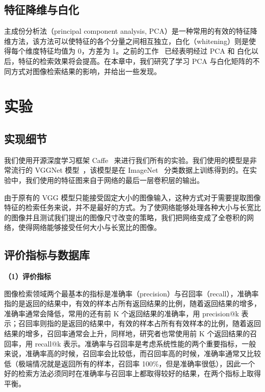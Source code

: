 \subsection{特征降维与白化}

主成份分析法（principal component analysis, PCA）是一种常用的有效的特征降维方法，该方法可以使特征的各个分量之间相互独立，白化（whitening）则是使得每个维度特征均值为 0，方差为 1。之前的工作~\cite{Babenko2014NeuralCF} 已经表明经过 PCA 和 白化以后，特征的检索效果将会提高。在本章中，我们研究了学习 PCA 与白化矩阵的不同方式对图像检索结果的影响，并给出一些发现。

\section{实验}\label{sec:mfc_experiment}
\subsection{实现细节}

我们使用开源深度学习框架 Caffe~\cite{Jia2014CaffeCA} 来进行我们所有的实验。我们使用的模型是非常流行的 VGGNet 模型~\cite{Simonyan2014VeryDC}，该模型是在 ImageNet~\cite{Russakovsky2015ImageNetLS} 分类数据上训练得到的。在实验中，我们使用的特征图来自于网络的最后一层卷积层的输出。

由于原有的 VGG 模型只能接受固定大小的图像输入，这种方式对于需要提取图像特征的检索任务来说，并不是最好的方式。为了使网络能够处理各种大小与长宽比的图像并且测试我们提出的图像尺寸改变的策略，我们把网络变成了全卷积的网络，使得网络能够接受任何大小与长宽比的图像。

\subsection{评价指标与数据库}

\noindent\textbf{（1）评价指标}

图像检索领域两个最基本的指标是准确率（precision）与召回率（recall），准确率指的是返回的结果中，有效的样本占所有返回结果的比例，随着返回结果的增多，准确率通常会降低，常用的还有前 K 个返回结果的准确率，用 precision@k 表示；召回率则指的是返回的结果中，有效的样本占所有有效样本的比例，随着返回结果的增多，召回率通常会上升，同样地，研究者也常使用前 K 个返回结果的召回率，用 recall@k 表示。准确率与召回率是考虑系统性能的两个重要指标，一般来说，准确率高的时候，召回率会比较低，而召回率高的时候，准确率通常又比较低（极端情况就是返回所有的样本，召回率 100\%，但是准确率很低），因此一个好的检索方法必须同时在准确率与召回率上都取得较好的结果，在两个指标上取得平衡。

